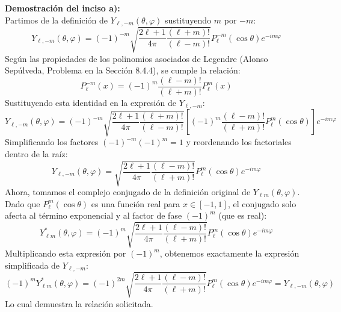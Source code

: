 \documentclass[a4paper]{article}
\begin{document}
\vspace{0.3cm}
\noindent\textbf{Demostración del inciso a):} \\
Partimos de la definición de $Y_{\ell, -m}(\theta, \varphi)$ sustituyendo $m$ por $-m$:
$$
Y_{\ell, -m}(\theta, \varphi) = (-1)^{-m} \sqrt{\frac{2\ell+1}{4\pi} \frac{(\ell+m)!}{(\ell-m)!}} P_\ell^{-m}(\cos\theta) e^{-im\varphi}
$$
Según las propiedades de los polinomios asociados de Legendre (Alonso Sepúlveda, Problema en la Sección 8.4.4), se cumple la relación:
$$
P_\ell^{-m}(x) = (-1)^m \frac{(\ell-m)!}{(\ell+m)!} P_\ell^m(x)
$$
Sustituyendo esta identidad en la expresión de $Y_{\ell, -m}$:
$$
Y_{\ell, -m}(\theta, \varphi) = (-1)^{-m} \sqrt{\frac{2\ell+1}{4\pi} \frac{(\ell+m)!}{(\ell-m)!}} \left[ (-1)^m \frac{(\ell-m)!}{(\ell+m)!} P_\ell^m(\cos\theta) \right] e^{-im\varphi}
$$
Simplificando los factores $(-1)^{-m}(-1)^m = 1$ y reordenando los factoriales dentro de la raíz:
$$
Y_{\ell, -m}(\theta, \varphi) = \sqrt{\frac{2\ell+1}{4\pi} \frac{(\ell-m)!}{(\ell+m)!}} P_\ell^m(\cos\theta) e^{-im\varphi}
$$
Ahora, tomamos el complejo conjugado de la definición original de $Y_{\ell m}(\theta, \varphi)$. Dado que $P_\ell^m(\cos\theta)$ es una función real para $x \in [-1, 1]$, el conjugado solo afecta al término exponencial y al factor de fase $(-1)^m$ (que es real):
$$
Y^*_{\ell m}(\theta, \varphi) = (-1)^m \sqrt{\frac{2\ell+1}{4\pi} \frac{(\ell-m)!}{(\ell+m)!}} P_\ell^m(\cos\theta) e^{-im\varphi}
$$
Multiplicando esta expresión por $(-1)^m$, obtenemos exactamente la expresión simplificada de $Y_{\ell, -m}$:
$$
(-1)^m Y^*_{\ell m}(\theta, \varphi) = (-1)^{2m} \sqrt{\frac{2\ell+1}{4\pi} \frac{(\ell-m)!}{(\ell+m)!}} P_\ell^m(\cos\theta) e^{-im\varphi} = Y_{\ell, -m}(\theta, \varphi)
$$
Lo cual demuestra la relación solicitada.
\end{document}
